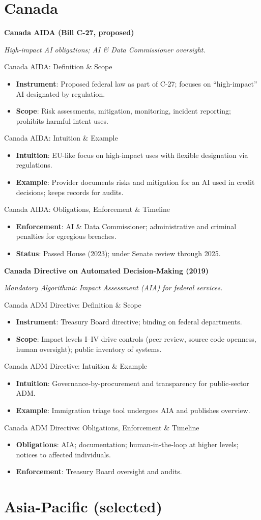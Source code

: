\documentclass[aspectratio=169]{beamer}
\newcommand{\RegTitle}[2]{%
  \begin{frame}[plain]
    \centering
    \vfill
    {\usebeamerfont{title}\usebeamercolor[fg]{title}\LARGE \textbf{#1}\par}
    \vspace{0.4em}
    {\small \itshape #2\par}
    \vfill
  \end{frame}
}
\newcommand{\RegDef}[2]{%
  \begin{frame}{#1: Definition \& Scope}
    \begin{itemize}
      #2
    \end{itemize}
  \end{frame}
}
\newcommand{\RegIntuition}[2]{%
  \begin{frame}{#1: Intuition \& Example}
    \begin{itemize}
      #2
    \end{itemize}
  \end{frame}
}
\newcommand{\RegCompliance}[2]{%
  \begin{frame}{#1: Obligations, Enforcement \& Timeline}
    \begin{itemize}
      #2
    \end{itemize}
  \end{frame}
}
\begin{document}
\section{Canada}

\RegTitle{Canada AIDA (Bill C-27, proposed)}{High-impact AI obligations; AI \& Data Commissioner oversight.}
\RegDef{Canada AIDA}{%
  \item \textbf{Instrument}: Proposed federal law as part of C-27; focuses on ``high-impact'' AI designated by regulation.
  \item \textbf{Scope}: Risk assessments, mitigation, monitoring, incident reporting; prohibits harmful intent uses.
}
\RegIntuition{Canada AIDA}{%
  \item \textbf{Intuition}: EU-like focus on high-impact uses with flexible designation via regulations.
  \item \textbf{Example}: Provider documents risks and mitigation for an AI used in credit decisions; keeps records for audits.
}
\RegCompliance{Canada AIDA}{%
  \item \textbf{Enforcement}: AI \& Data Commissioner; administrative and criminal penalties for egregious breaches.
  \item \textbf{Status}: Passed House (2023); under Senate review through 2025.
}

\RegTitle{Canada Directive on Automated Decision-Making (2019)}{Mandatory Algorithmic Impact Assessment (AIA) for federal services.}
\RegDef{Canada ADM Directive}{%
  \item \textbf{Instrument}: Treasury Board directive; binding on federal departments.
  \item \textbf{Scope}: Impact levels I--IV drive controls (peer review, source code openness, human oversight); public inventory of systems.
}
\RegIntuition{Canada ADM Directive}{%
  \item \textbf{Intuition}: Governance-by-procurement and transparency for public-sector ADM.
  \item \textbf{Example}: Immigration triage tool undergoes AIA and publishes overview.
}
\RegCompliance{Canada ADM Directive}{%
  \item \textbf{Obligations}: AIA; documentation; human-in-the-loop at higher levels; notices to affected individuals.
  \item \textbf{Enforcement}: Treasury Board oversight and audits.
}

\section{Asia-Pacific (selected)}
\end{document}
